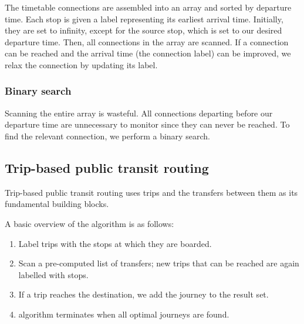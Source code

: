 The timetable connections are assembled into an array and sorted by departure time. Each stop is given a label representing its earliest arrival time. Initially, they are set to infinity, except for the source stop, which is set to our desired departure time. Then, all connections in the array are scanned. If a connection can be reached and the arrival time (the connection label) can be improved, we relax the connection by updating its label. 

\subsubsection{Binary search}
Scanning the entire array is wasteful. All connections departing before our departure time are unnecessary to monitor since they can never be reached. To find the relevant connection, we perform a binary search. 
\subsection{Trip-based public transit routing}
Trip-based public transit routing uses trips and the transfers between them as its fundamental building blocks. 

A basic overview of the algorithm is as follows:
\begin{enumerate}
    \item Label trips with the stops at which they are boarded.
    \item Scan a pre-computed list of transfers; new trips that can be reached are again labelled with stops.
    \item If a trip reaches the destination, we add the journey to the result set.
    \item algorithm terminates when all optimal journeys are found.
\end{enumerate}

